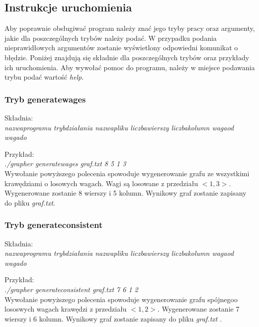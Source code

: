 \documentclass{article}
\begin{document}
\newpage

\subsection{Instrukcje uruchomienia}

Aby poprawnie obsługiwać program należy znać jego tryby pracy oraz argumenty, jakie dla poszczególnych trybów należy podać. W przypadku podania nieprawidłowych argumentów zostanie wyświetlony odpowiedni komunikat o błędzie. Poniżej znajdują się składnie dla poszczególnych trybów oraz przykłady ich uruchomienia. Aby wywołać pomoc do programu, należy w miejsce podawania trybu podać wartość \emph{help}.

\medskip

\subsubsection{Tryb generate\textunderscore wages}
Składnia:\\
\textit{nazwa\textunderscore programu tryb\textunderscore działania nazwa\textunderscore pliku liczba\textunderscore wierszy liczba\textunderscore kolumn waga\textunderscore od waga\textunderscore do}

\medskip

\noindent Przykład:\\
\textit{./grapher generate\textunderscore wages graf.txt 8 5 1 3}\\
Wywołanie powyższego polecenia spowoduje wygenerowanie grafu ze wszystkimi krawędziami o losowych wagach. Wagi są losowane z przedziału $<1, 3>$. Wygenerowane zostanie 8 wierszy i 5 kolumn. Wynikowy graf zostanie zapisany do pliku \emph{graf.txt}.

\subsubsection{Tryb generate\textunderscore consistent}
Składnia:\\
\textit{nazwa\textunderscore programu tryb\textunderscore działania nazwa\textunderscore pliku liczba\textunderscore wierszy liczba\textunderscore kolumn waga\textunderscore od waga\textunderscore do}

\medskip

\noindent Przykład:\\
\textit{./grapher generate\textunderscore consistent graf.txt 7 6 1 2}\\
Wywołanie powyższego polecenia spowoduje wygenerowanie grafu spójnego\linebreak o lososwych wagach krawędzi z przedziału $<1, 2>$. Wygenerowane zostanie 7 wierszy i 6 kolumn. Wynikowy graf zostanie zapisany do pliku \emph{graf.txt} .
\end{document}

